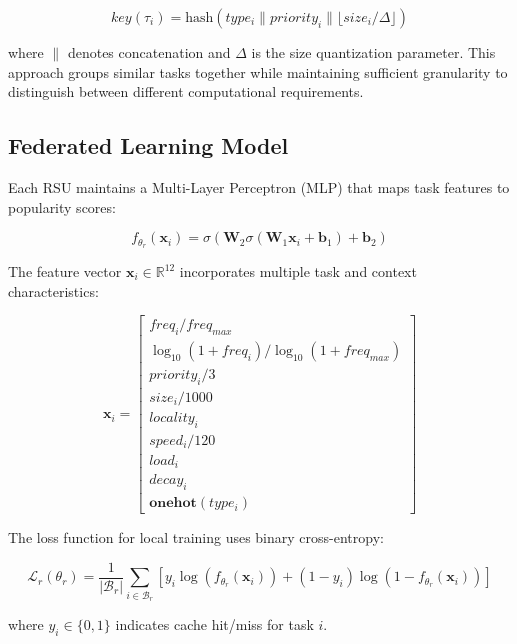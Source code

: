\documentclass[11pt]{article}
\begin{document}
\begin{equation}
key(\tau_i) = \text{hash}(type_i \parallel priority_i \parallel \lfloor size_i / \Delta \rfloor)
\end{equation}

where $\parallel$ denotes concatenation and $\Delta$ is the size quantization parameter. This approach groups similar tasks together while maintaining sufficient granularity to distinguish between different computational requirements.

\subsection{Federated Learning Model}

Each RSU maintains a Multi-Layer Perceptron (MLP) that maps task features to popularity scores:

\begin{equation}
f_{\theta_r}(\mathbf{x}_i) = \sigma(\mathbf{W}_2 \sigma(\mathbf{W}_1 \mathbf{x}_i + \mathbf{b}_1) + \mathbf{b}_2)
\end{equation}

The feature vector $\mathbf{x}_i \in \mathbb{R}^{12}$ incorporates multiple task and context characteristics:

\begin{equation}
\mathbf{x}_i = \begin{bmatrix}
freq_i / freq_{max} \\
\log_{10}(1 + freq_i) / \log_{10}(1 + freq_{max}) \\
priority_i / 3 \\
size_i / 1000 \\
locality_i \\
speed_i / 120 \\
load_i \\
decay_i \\
\mathbf{onehot}(type_i)
\end{bmatrix}
\end{equation}

The loss function for local training uses binary cross-entropy:

\begin{equation}
\mathcal{L}_r(\theta_r) = \frac{1}{|\mathcal{B}_r|} \sum_{i \in \mathcal{B}_r} \left[ y_i \log(f_{\theta_r}(\mathbf{x}_i)) + (1-y_i) \log(1-f_{\theta_r}(\mathbf{x}_i)) \right]
\end{equation}

where $y_i \in \{0,1\}$ indicates cache hit/miss for task $i$.
\end{document}
